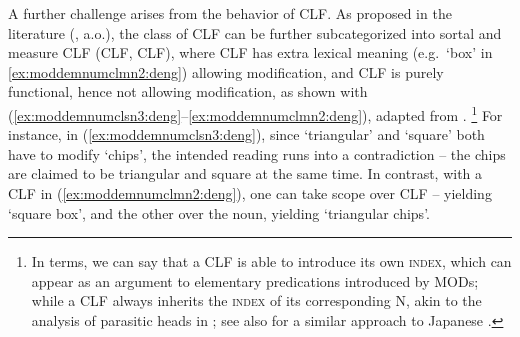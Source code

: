 \documentclass[output=paper,colorlinks,citecolor=brown]{langscibook}
\begin{document}
A further challenge arises from the behavior of CLF.  As proposed in the literature (\citealt{Cheng&Sybesma99a,Her12a,Her12b,Li13a}, a.o.), the class of CLF can be further subcategorized into sortal and measure CLF  (CLF, CLF), where CLF has extra lexical meaning (e.g.\ `box' in \ref{ex:moddemnumclmn2:deng}) allowing modification, and CLF is purely functional, hence not allowing modification, as shown with  (\ref{ex:moddemnumclsn3:deng}--\ref{ex:moddemnumclmn2:deng}),  
adapted from \citet[7]{Zhang11a}.%
%
\footnote{In  terms, we can say that a CLF is able to introduce its own \textsc{index}, which can appear as an argument to elementary predications introduced by MODs; while a CLF always inherits the \textsc{index} of its corresponding N, akin to the analysis of parasitic heads in \citet{Levine10a}; see also \citet{Ben&Sie04} for a similar approach to Japanese .} %
%
For instance, in (\ref{ex:moddemnumclsn3:deng}), since `triangular' and `square' both have to modify `chips',  the intended reading runs into a contradiction -- the chips are claimed to be triangular and square at the same time. In contrast, with a CLF in (\ref{ex:moddemnumclmn2:deng}), one  can take scope over CLF --  yielding `square box', and the other over the noun, yielding `triangular chips'.



	\ea[\#]{
	\gll %
	\obj{sanjiaoxing} \obj{de} na fangfangzhengzheng de \obj{san} \obj{pian} shupian\\
	triangular \textsc{de} \textsc{dem} square \textsc{de} three \textsc{clf}\down{s} chips\\
	\glt Intended: `those triangular square chips'
	\label{ex:moddemnumclsn3:deng}  
}

\ex[ ]{
	\gll %
	\obj{sanjiaoxing} \obj{de} na fangfangzhengzheng de \obj{san} \obj{xiang} shupian\\
	triangular  \textsc{de} \textsc{dem} square \textsc{de} three \textsc{clf}\down{m $\approx$ `box'}  chips\\
	\glt `those three square boxes of triangular chips' \\ %
	\label{ex:moddemnumclmn2:deng}  
}
\end{document}

